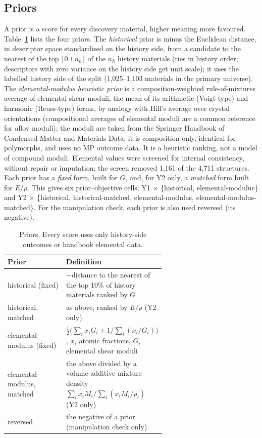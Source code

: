 \subsection{Priors}\label{sec:priors}
A prior is a score for every discovery material, higher meaning more favoured. Table~\ref{tab:priors} lists the four priors.
The \emph{historical} prior is minus the Euclidean distance, in descriptor space standardised on the history side, from a
candidate to the nearest of the top $\lceil0.1\,n_h\rceil$ of the $n_h$ history materials (ties in history order; descriptors with
zero variance on the history side get unit scale); it uses the labelled history side of the split (1,025--1,103
materials in the primary universe). The
\emph{elemental-modulus heuristic prior} is a composition-weighted rule-of-mixtures average of elemental shear moduli, the mean of
its arithmetic (Voigt-type) and harmonic (Reuss-type) forms, by analogy with Hill's average over crystal orientations\cite{hill1952}
(compositional averages of elemental moduli are a common reference for alloy moduli\cite{feng2018elastic}); the moduli are taken from the Springer
Handbook of Condensed Matter and Materials Data\cite{martienssen2005handbook}; it is composition-only, identical for polymorphs,
and uses no MP outcome data. It is a heuristic ranking, not a model of compound moduli. Elemental values were screened for internal
consistency, without repair or imputation; the screen removed 1,161 of the 4,711 structures. Each prior has a \emph{fixed} form,
built for $G$, and, for Y2 only, a \emph{matched} form built for $E/\rho$. This gives six prior--objective cells:
Y1 $\times$ \{historical, elemental-modulus\} and Y2 $\times$ \{historical, historical-matched, elemental-modulus,
elemental-modulus-matched\}. For the manipulation check, each prior is also used reversed (its negative).

\begin{table}[t]
\centering\small
\caption{Priors. Every score uses only history-side outcomes or handbook elemental data.}
\label{tab:priors}
\begin{tabular}{@{}lp{0.62\linewidth}@{}}
\toprule
Prior & Definition \\
\midrule
historical (fixed) & $-$distance to the nearest of the top 10\% of history materials ranked by $G$ \\
historical, matched & as above, ranked by $E/\rho$ (Y2 only) \\
elemental-modulus (fixed) & $\tfrac12\bigl(\sum_i x_i G_i + 1/\sum_i (x_i/G_i)\bigr)$, $x_i$ atomic fractions, $G_i$ elemental shear moduli \\
elemental-modulus, matched & the above divided by a volume-additive mixture density $\sum_i x_iM_i/\sum_i(x_iM_i/\rho_i)$ (Y2 only) \\
reversed & the negative of a prior (manipulation check only) \\
\bottomrule
\end{tabular}
\end{table}


